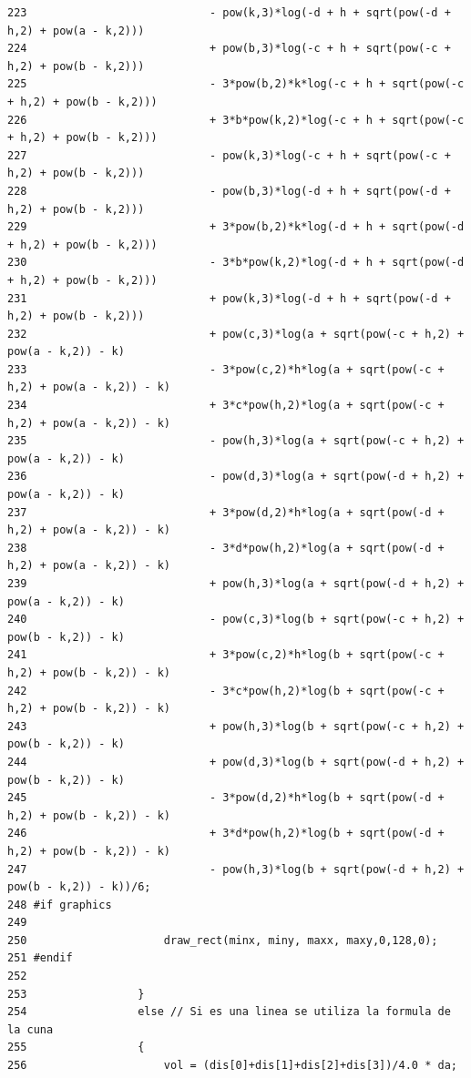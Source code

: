 \begin{Code}
\begin{verbatim}
223                            - pow(k,3)*log(-d + h + sqrt(pow(-d + h,2) + pow(a - k,2)))
224                            + pow(b,3)*log(-c + h + sqrt(pow(-c + h,2) + pow(b - k,2)))
225                            - 3*pow(b,2)*k*log(-c + h + sqrt(pow(-c + h,2) + pow(b - k,2)))
226                            + 3*b*pow(k,2)*log(-c + h + sqrt(pow(-c + h,2) + pow(b - k,2)))
227                            - pow(k,3)*log(-c + h + sqrt(pow(-c + h,2) + pow(b - k,2)))
228                            - pow(b,3)*log(-d + h + sqrt(pow(-d + h,2) + pow(b - k,2)))
229                            + 3*pow(b,2)*k*log(-d + h + sqrt(pow(-d + h,2) + pow(b - k,2)))
230                            - 3*b*pow(k,2)*log(-d + h + sqrt(pow(-d + h,2) + pow(b - k,2)))
231                            + pow(k,3)*log(-d + h + sqrt(pow(-d + h,2) + pow(b - k,2)))
232                            + pow(c,3)*log(a + sqrt(pow(-c + h,2) + pow(a - k,2)) - k)
233                            - 3*pow(c,2)*h*log(a + sqrt(pow(-c + h,2) + pow(a - k,2)) - k)
234                            + 3*c*pow(h,2)*log(a + sqrt(pow(-c + h,2) + pow(a - k,2)) - k)
235                            - pow(h,3)*log(a + sqrt(pow(-c + h,2) + pow(a - k,2)) - k)
236                            - pow(d,3)*log(a + sqrt(pow(-d + h,2) + pow(a - k,2)) - k)
237                            + 3*pow(d,2)*h*log(a + sqrt(pow(-d + h,2) + pow(a - k,2)) - k)
238                            - 3*d*pow(h,2)*log(a + sqrt(pow(-d + h,2) + pow(a - k,2)) - k)
239                            + pow(h,3)*log(a + sqrt(pow(-d + h,2) + pow(a - k,2)) - k)
240                            - pow(c,3)*log(b + sqrt(pow(-c + h,2) + pow(b - k,2)) - k)
241                            + 3*pow(c,2)*h*log(b + sqrt(pow(-c + h,2) + pow(b - k,2)) - k)
242                            - 3*c*pow(h,2)*log(b + sqrt(pow(-c + h,2) + pow(b - k,2)) - k)
243                            + pow(h,3)*log(b + sqrt(pow(-c + h,2) + pow(b - k,2)) - k)
244                            + pow(d,3)*log(b + sqrt(pow(-d + h,2) + pow(b - k,2)) - k)
245                            - 3*pow(d,2)*h*log(b + sqrt(pow(-d + h,2) + pow(b - k,2)) - k)
246                            + 3*d*pow(h,2)*log(b + sqrt(pow(-d + h,2) + pow(b - k,2)) - k)
247                            - pow(h,3)*log(b + sqrt(pow(-d + h,2) + pow(b - k,2)) - k))/6;
248 #if graphics
249 
250                     draw_rect(minx, miny, maxx, maxy,0,128,0);
251 #endif
252 
253                 }
254                 else // Si es una linea se utiliza la formula de la cuna
255                 {
256                     vol = (dis[0]+dis[1]+dis[2]+dis[3])/4.0 * da;

\end{verbatim}
\end{Code}
